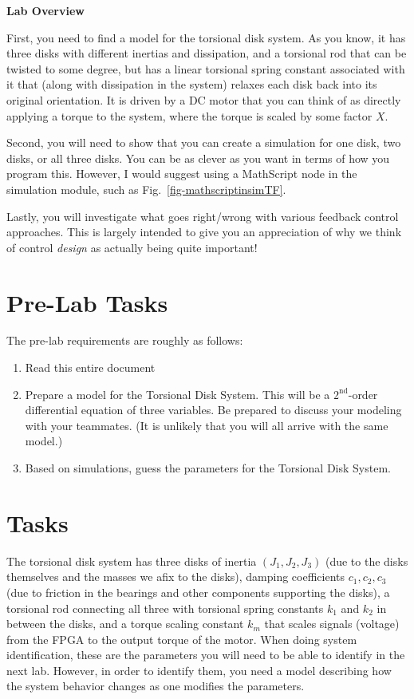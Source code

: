 \begin{center} \textbf{Lab Overview}
\end{center}

First, you need to find a model for the torsional disk system.  As you know, it
has three disks with different inertias and dissipation, and a torsional rod
that can be twisted to some degree, but has a linear torsional spring constant
associated with it that (along with dissipation in the system) relaxes each disk
back into its original orientation.  It is driven by a DC motor that you can
think of as directly applying a torque to the system, where the torque is scaled
by some factor $X$.

Second, you will need to show that you can create a simulation for one disk, two
disks, or all three disks.  You can be as clever as you want in terms of how you
program this.  However, I would suggest using a MathScript node in the
simulation module, such as Fig.~\ref{fig-mathscriptinsimTF}.  

Lastly, you will investigate what goes right/wrong with various feedback control
approaches.  This is largely intended to give you an appreciation of why we
think of control \emph{design} as actually being quite important!

\section{Pre-Lab Tasks}

The pre-lab requirements are roughly as follows:
\begin{enumerate}
\item Read this entire document
\item Prepare a model for the Torsional Disk System.  This will be a
  $2^{\textrm{nd}}$-order differential equation of three variables.  Be prepared
  to discuss your modeling with your teammates.  (It is unlikely that you will
  all arrive with the same model.)
\item Based on simulations, guess the parameters for the Torsional Disk System.
\end{enumerate}


\section{Tasks}


The torsional disk system has three disks of inertia $(J_1,J_2,J_3)$ (due to the
disks themselves and the masses we afix to the disks), damping coefficients
$c_1,c_2,c_3$ (due to friction in the bearings and other components supporting
the disks), a torsional rod connecting all three with torsional spring constants
$k_1$ and $k_2$ in between the disks, and a torque scaling constant $k_m$ that
scales signals (voltage) from the FPGA to the output torque of the motor.  When
doing system identification, these are the parameters you will need to be able
to identify in the next lab.  However, in order to identify them, you need a
model describing how the system behavior changes as one modifies the parameters.




